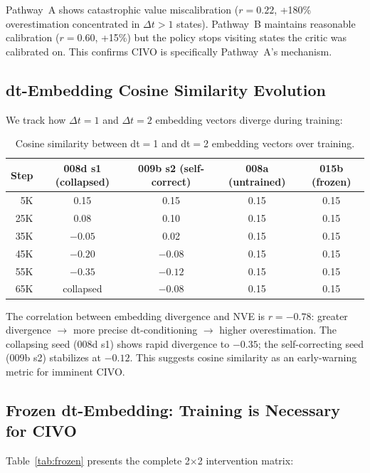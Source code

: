 \documentclass[10pt,letterpaper]{article}
\begin{document}
Pathway~A shows catastrophic value miscalibration ($r = 0.22$, +180\% overestimation concentrated in $\Delta t > 1$ states). Pathway~B maintains reasonable calibration ($r = 0.60$, +15\%) but the policy stops visiting states the critic was calibrated on. This confirms CIVO is specifically Pathway~A's mechanism.

\subsection{dt-Embedding Cosine Similarity Evolution}
\label{sec:cosine}

We track how $\Delta t = 1$ and $\Delta t = 2$ embedding vectors diverge during training:

\begin{table}[h]
\centering
\caption{Cosine similarity between dt$=$1 and dt$=$2 embedding vectors over training.}
\label{tab:cosine}
\begin{tabular}{rcccc}
\toprule
Step & 008d s1 (collapsed) & 009b s2 (self-correct) & 008a (untrained) & 015b (frozen) \\
\midrule
5K  & 0.15  & 0.15  & 0.15 & 0.15 \\
25K & 0.08  & 0.10  & 0.15 & 0.15 \\
35K & $-0.05$ & 0.02  & 0.15 & 0.15 \\
45K & $-0.20$ & $-0.08$ & 0.15 & 0.15 \\
55K & $-0.35$ & $-0.12$ & 0.15 & 0.15 \\
65K & collapsed & $-0.08$ & 0.15 & 0.15 \\
\bottomrule
\end{tabular}
\end{table}

The correlation between embedding divergence and NVE is $r = -0.78$: greater divergence $\to$ more precise dt-conditioning $\to$ higher overestimation. The collapsing seed (008d s1) shows rapid divergence to $-0.35$; the self-correcting seed (009b s2) stabilizes at $-0.12$. This suggests cosine similarity as an early-warning metric for imminent CIVO.

\subsection{Frozen dt-Embedding: Training is Necessary for CIVO}
\label{sec:frozen}

Table~\ref{tab:frozen} presents the complete 2$\times$2 intervention matrix:
\end{document}

